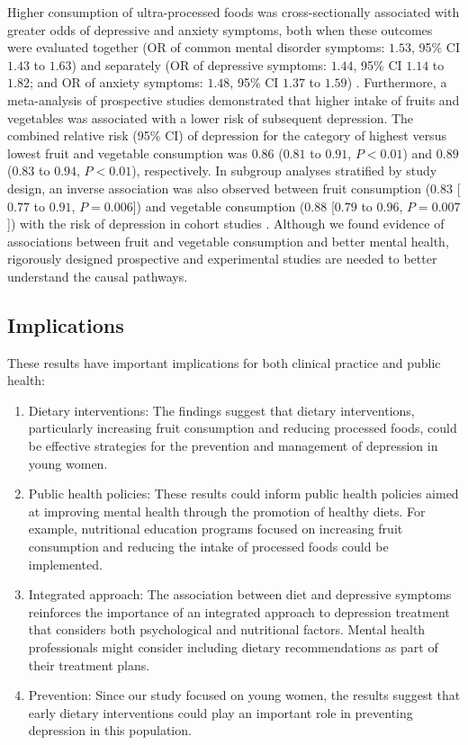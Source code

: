 \documentclass[jou]{apa7}
\begin{document}
Higher consumption of ultra-processed foods was cross-sectionally associated with greater odds of depressive and anxiety symptoms, both when these outcomes were evaluated together (OR of common mental disorder symptoms: $1.53$, 95\% CI $1.43$ to $1.63$) and separately (OR of depressive symptoms: $1.44$, 95\% CI $1.14$ to $1.82$; and OR of anxiety symptoms: $1.48$, 95\% CI $1.37$ to $1.59$) \parencite{laneUltraProcessedFoodConsumption2022}. Furthermore, a meta-analysis of prospective studies demonstrated that higher intake of fruits and vegetables was associated with a lower risk of subsequent depression. The combined relative risk (95\% CI) of depression for the category of highest versus lowest fruit and vegetable consumption was $0.86$ ($0.81$ to $0.91$, $P < 0.01$) and $0.89$ ($0.83$ to $0.94$, $P < 0.01$), respectively. In subgroup analyses stratified by study design, an inverse association was also observed between fruit consumption ($0.83$ [$0.77$ to $0.91$, $P = 0.006$]) and vegetable consumption ($0.88$ [$0.79$ to $0.96$, $P = 0.007$]) with the risk of depression in cohort studies \parencite{liuFruitVegetableConsumption2016}. Although we found evidence of associations between fruit and vegetable consumption and better mental health, rigorously designed prospective and experimental studies are needed to better understand the causal pathways.


\subsection{Implications}\label{implicaciones}

These results have important implications for both clinical practice and public health:

\begin{enumerate}
	\item Dietary interventions: The findings suggest that dietary interventions, particularly increasing fruit consumption and reducing processed foods, could be effective strategies for the prevention and management of depression in young women.
	\item Public health policies: These results could inform public health policies aimed at improving mental health through the promotion of healthy diets. For example, nutritional education programs focused on increasing fruit consumption and reducing the intake of processed foods could be implemented.
	\item Integrated approach: The association between diet and depressive symptoms reinforces the importance of an integrated approach to depression treatment that considers both psychological and nutritional factors. Mental health professionals might consider including dietary recommendations as part of their treatment plans.
	\item Prevention: Since our study focused on young women, the results suggest that early dietary interventions could play an important role in preventing depression in this population.
\end{enumerate}
\end{document}
